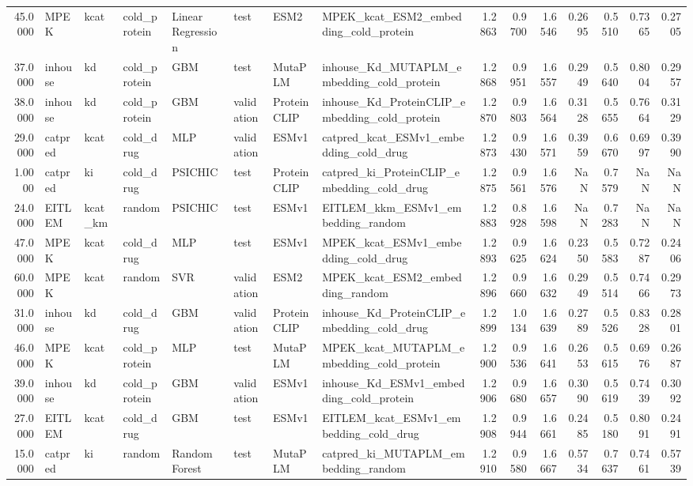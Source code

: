 \begin{tabular}{rlllllllrrrrrrr}
45.0000 & MPEK & kcat & cold_protein & Linear Regression & test & ESM2 & MPEK_kcat_ESM2_embedding_cold_protein & 1.2863 & 0.9700 & 1.6546 & 0.2695 & 0.5510 & 0.7365 & 0.2705 \\
37.0000 & inhouse & kd & cold_protein & GBM & test & MutaPLM & inhouse_Kd_MUTAPLM_embedding_cold_protein & 1.2868 & 0.9951 & 1.6557 & 0.2949 & 0.5640 & 0.8004 & 0.2957 \\
38.0000 & inhouse & kd & cold_protein & GBM & validation & ProteinCLIP & inhouse_Kd_ProteinCLIP_embedding_cold_protein & 1.2870 & 0.9803 & 1.6564 & 0.3128 & 0.5655 & 0.7664 & 0.3129 \\
29.0000 & catpred & kcat & cold_drug & MLP & validation & ESMv1 & catpred_kcat_ESMv1_embedding_cold_drug & 1.2873 & 0.9430 & 1.6571 & 0.3959 & 0.6670 & 0.6997 & 0.3990 \\
1.0000 & catpred & ki & cold_drug & PSICHIC & test & ProteinCLIP & catpred_ki_ProteinCLIP_embedding_cold_drug & 1.2875 & 0.9561 & 1.6576 & NaN & 0.7579 & NaN & NaN \\
24.0000 & EITLEM & kcat_km & random & PSICHIC & test & ESMv1 & EITLEM_kkm_ESMv1_embedding_random & 1.2883 & 0.8928 & 1.6598 & NaN & 0.7283 & NaN & NaN \\
47.0000 & MPEK & kcat & cold_drug & MLP & test & ESMv1 & MPEK_kcat_ESMv1_embedding_cold_drug & 1.2893 & 0.9625 & 1.6624 & 0.2350 & 0.5583 & 0.7287 & 0.2406 \\
60.0000 & MPEK & kcat & random & SVR & validation & ESM2 & MPEK_kcat_ESM2_embedding_random & 1.2896 & 0.9660 & 1.6632 & 0.2949 & 0.5514 & 0.7466 & 0.2973 \\
31.0000 & inhouse & kd & cold_drug & GBM & validation & ProteinCLIP & inhouse_Kd_ProteinCLIP_embedding_cold_drug & 1.2899 & 1.0134 & 1.6639 & 0.2789 & 0.5526 & 0.8328 & 0.2801 \\
46.0000 & MPEK & kcat & cold_protein & MLP & test & MutaPLM & MPEK_kcat_MUTAPLM_embedding_cold_protein & 1.2900 & 0.9536 & 1.6641 & 0.2653 & 0.5615 & 0.6976 & 0.2687 \\
39.0000 & inhouse & kd & cold_protein & GBM & validation & ESMv1 & inhouse_Kd_ESMv1_embedding_cold_protein & 1.2906 & 0.9680 & 1.6657 & 0.3090 & 0.5619 & 0.7439 & 0.3092 \\
27.0000 & EITLEM & kcat & cold_drug & GBM & test & ESMv1 & EITLEM_kcat_ESMv1_embedding_cold_drug & 1.2908 & 0.9944 & 1.6661 & 0.2485 & 0.5180 & 0.8091 & 0.2491 \\
15.0000 & catpred & ki & random & Random Forest & test & MutaPLM & catpred_ki_MUTAPLM_embedding_random & 1.2910 & 0.9580 & 1.6667 & 0.5734 & 0.7637 & 0.7461 & 0.5739 \\

\end{tabular}
